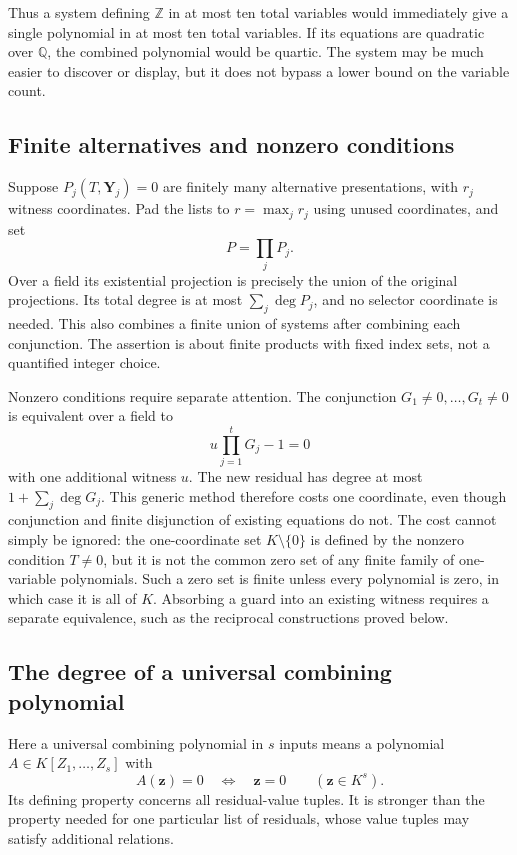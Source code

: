 \documentclass[11pt]{article}
\theoremstyle{definition}
\begin{document}
Thus a system defining $\mathbb Z$ in at most ten total variables
would immediately give a single polynomial in at most ten total
variables.  If its equations are quadratic over $\mathbb Q$,
the combined polynomial would be quartic.  The system may be
much easier to discover or display, but it does not bypass a
lower bound on the variable count.

\subsection{Finite alternatives and nonzero conditions}

Suppose $P_j(T,\mathbf Y_j)=0$ are finitely many alternative
presentations, with $r_j$ witness coordinates.  Pad the lists to
$r=\max_jr_j$ using unused coordinates, and set
\[
                          P=\prod_j P_j.
\]
Over a field its existential projection is precisely the union
of the original projections.  Its total degree is at most
$\sum_j\deg P_j$, and no selector coordinate is needed.  This
also combines a finite union of systems after combining each
conjunction.  The assertion is about finite products with fixed
index sets, not a quantified integer choice.

Nonzero conditions require separate attention.  The conjunction
$G_1\ne0,\ldots,G_t\ne0$ is equivalent over a field to
\[
                         u\prod_{j=1}^tG_j-1=0
\]
with one additional witness $u$.  The new residual has degree at
most $1+\sum_j\deg G_j$.  This generic method therefore costs
one coordinate, even though conjunction and finite disjunction
of existing equations do not.  The cost cannot simply be ignored:
the one-coordinate set $K\setminus\{0\}$ is defined by the
nonzero condition $T\ne0$, but it is not the common zero set of
any finite family of one-variable polynomials.  Such a zero set
is finite unless every polynomial is zero, in which case it is
all of $K$.  Absorbing a guard into an existing witness requires
a separate equivalence, such as the reciprocal constructions
proved below.

\subsection{The degree of a universal combining polynomial}

Here a universal combining polynomial in $s$ inputs means a
polynomial $A\in K[Z_1,\ldots,Z_s]$ with
\[
              A(\mathbf z)=0\quad\Longleftrightarrow\quad
                           \mathbf z=0\qquad(\mathbf z\in K^s).
\]
Its defining property concerns all residual-value tuples.  It
is stronger than the property needed for one particular list
of residuals, whose value tuples may satisfy additional relations.
\end{document}
